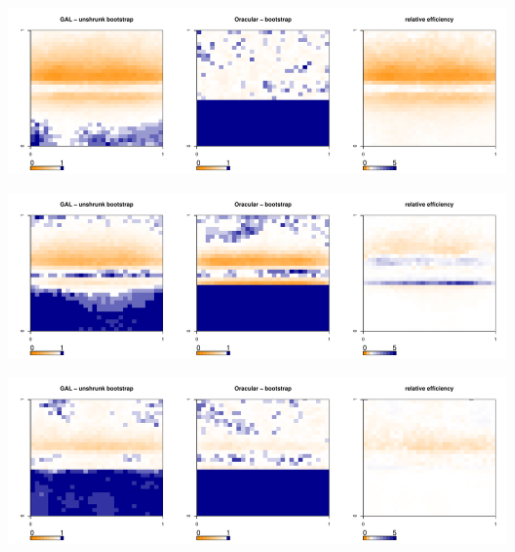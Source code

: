 	\begin{center}
		\includegraphics[width=0.99\textwidth]{../../figures/X1-28-6.pdf}
		\label{fig:coveragemap6}
	\end{center}
	
	\begin{center}
		\includegraphics[width=0.99\textwidth]{../../figures/X1-28-7.pdf}
		\label{fig:coveragemap7}
	\end{center}
		        
	\begin{center}
		\includegraphics[width=0.99\textwidth]{../../figures/X1-28-8.pdf}
		\label{fig:coveragemap8}
	\end{center}
	
